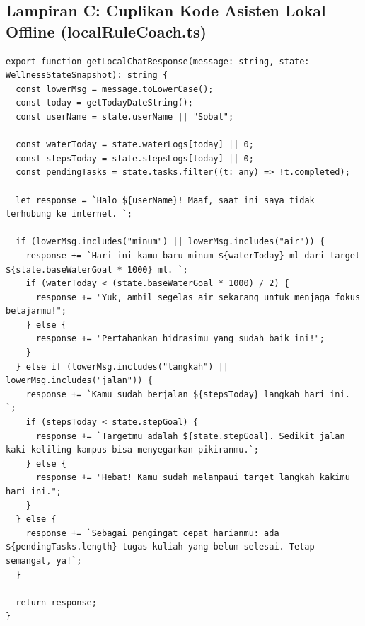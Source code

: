 \documentclass[12pt,a4paper]{article}
\begin{document}
\subsection{Lampiran C: Cuplikan Kode Asisten Lokal Offline (localRuleCoach.ts)}
\begin{lstlisting}[caption=Penentuan Jawaban Asisten Lokal]
export function getLocalChatResponse(message: string, state: WellnessStateSnapshot): string {
  const lowerMsg = message.toLowerCase();
  const today = getTodayDateString();
  const userName = state.userName || "Sobat";

  const waterToday = state.waterLogs[today] || 0;
  const stepsToday = state.stepsLogs[today] || 0;
  const pendingTasks = state.tasks.filter((t: any) => !t.completed);

  let response = `Halo ${userName}! Maaf, saat ini saya tidak terhubung ke internet. `;

  if (lowerMsg.includes("minum") || lowerMsg.includes("air")) {
    response += `Hari ini kamu baru minum ${waterToday} ml dari target ${state.baseWaterGoal * 1000} ml. `;
    if (waterToday < (state.baseWaterGoal * 1000) / 2) {
      response += "Yuk, ambil segelas air sekarang untuk menjaga fokus belajarmu!";
    } else {
      response += "Pertahankan hidrasimu yang sudah baik ini!";
    }
  } else if (lowerMsg.includes("langkah") || lowerMsg.includes("jalan")) {
    response += `Kamu sudah berjalan ${stepsToday} langkah hari ini. `;
    if (stepsToday < state.stepGoal) {
      response += `Targetmu adalah ${state.stepGoal}. Sedikit jalan kaki keliling kampus bisa menyegarkan pikiranmu.`;
    } else {
      response += "Hebat! Kamu sudah melampaui target langkah kakimu hari ini.";
    }
  } else {
    response += `Sebagai pengingat cepat harianmu: ada ${pendingTasks.length} tugas kuliah yang belum selesai. Tetap semangat, ya!`;
  }

  return response;
}
\end{lstlisting}
\end{document}
